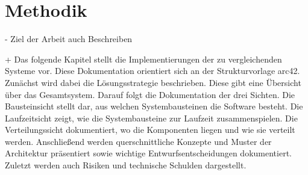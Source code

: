 \section{Methodik}

- Ziel der Arbeit auch Beschreiben


+
Das folgende Kapitel stellt die Implementierungen der zu vergleichenden Systeme vor. Diese Dokumentation orientiert sich an der Strukturvorlage arc42\autocite{starke2007strukturvorlage}. Zunächst wird dabei die Lösungsstrategie beschrieben. Diese gibt eine Übersicht über das Gesamtsystem. Darauf folgt die Dokumentation der drei Sichten. Die Bausteinsicht stellt dar, aus welchen Systembausteinen die Software besteht. Die Laufzeitsicht zeigt, wie die Systembausteine zur Laufzeit zusammenspielen. Die Verteilungssicht dokumentiert, wo die Komponenten liegen und wie sie verteilt werden. Anschließend werden querschnittliche Konzepte und Muster der Architektur präsentiert sowie wichtige Entwurfsentscheidungen dokumentiert. Zuletzt werden auch Risiken und technische Schulden dargestellt.